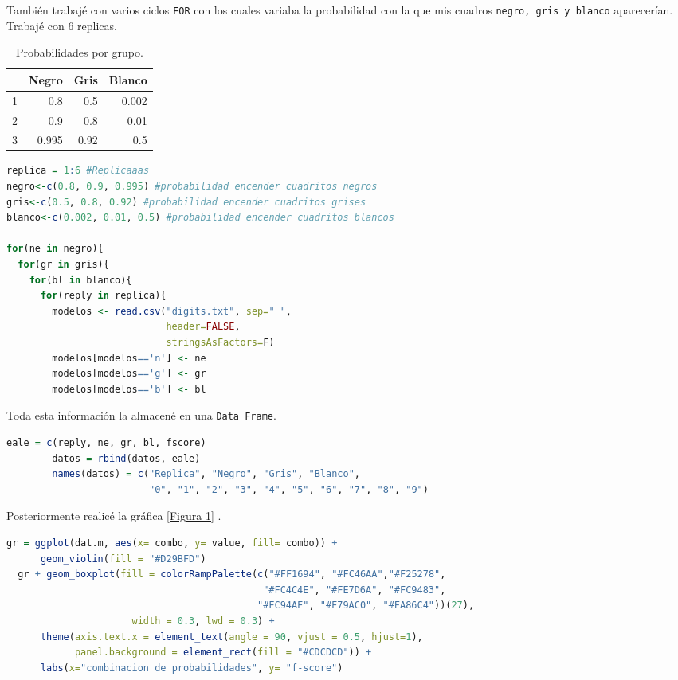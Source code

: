 \documentclass{article}
\begin{document}
Tambi\'en trabaj\'e con varios ciclos \texttt{FOR} con los cuales variaba la probabilidad con la que mis cuadros \texttt{negro, gris y blanco} aparecer\'ian. Trabaj\'e con 6 replicas.

\begin{table}[ht]
    \centering
    \caption{Probabilidades por grupo.} 
    \begin{tabular}{|r|r|r|r|}
    \hline
     & Negro & Gris & Blanco  \\
    \hline
    1 & 0.8 & 0.5 & 0.002 \\
    \hline
    2 & 0.9 & 0.8 & 0.01 \\
    \hline
    3 & 0.995 & 0.92 & 0.5\\
    \hline
\end{tabular}
    \label{cuadro 1}
\end{table}


\begin{lstlisting}[language=R, caption= Segmento de c\'odigo ciclos \texttt{FOR}.]
replica = 1:6 #Replicaaas
negro<-c(0.8, 0.9, 0.995) #probabilidad encender cuadritos negros
gris<-c(0.5, 0.8, 0.92) #probabilidad encender cuadritos grises
blanco<-c(0.002, 0.01, 0.5) #probabilidad encender cuadritos blancos

for(ne in negro){
  for(gr in gris){
    for(bl in blanco){
      for(reply in replica){
        modelos <- read.csv("digits.txt", sep=" ",
                            header=FALSE, 
                            stringsAsFactors=F)
        modelos[modelos=='n'] <- ne
        modelos[modelos=='g'] <- gr
        modelos[modelos=='b'] <- bl
\end{lstlisting}

Toda esta informaci\'on la almacen\'e en una \texttt{Data Frame}.
\begin{lstlisting}[language=R, caption= Segmento de c\'odigo Data Frame.]
eale = c(reply, ne, gr, bl, fscore)
        datos = rbind(datos, eale)
        names(datos) = c("Replica", "Negro", "Gris", "Blanco",
                         "0", "1", "2", "3", "4", "5", "6", "7", "8", "9")
\end{lstlisting}

Posteriormente realic\'e la gr\'afica \ref{Figura 1} .
\begin{lstlisting}[language=R, caption= Segmento de c\'odigo Gr\'afica.]
gr = ggplot(dat.m, aes(x= combo, y= value, fill= combo)) +
      geom_violin(fill = "#D29BFD")
  gr + geom_boxplot(fill = colorRampPalette(c("#FF1694", "#FC46AA","#F25278", 
                                             "#FC4C4E", "#FE7D6A", "#FC9483",
                                            "#FC94AF", "#F79AC0", "#FA86C4"))(27), 
                      width = 0.3, lwd = 0.3) +
      theme(axis.text.x = element_text(angle = 90, vjust = 0.5, hjust=1),
            panel.background = element_rect(fill = "#CDCDCD")) +
      labs(x="combinacion de probabilidades", y= "f-score")
\end{lstlisting}
\end{document}
